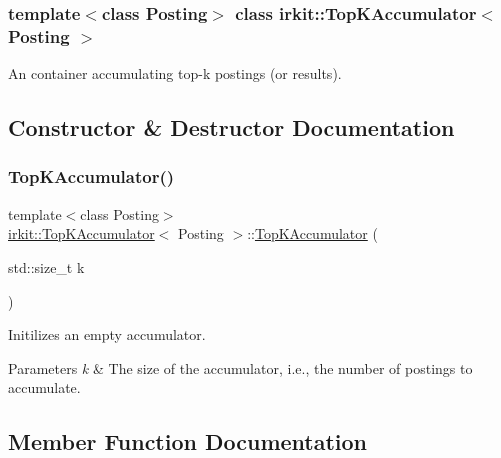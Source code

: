 \subsubsection*{template$<$class Posting$>$\newline
class irkit\+::\+Top\+K\+Accumulator$<$ Posting $>$}

An container accumulating top-\/k postings (or results). 

\subsection{Constructor \& Destructor Documentation}
\mbox{\label{classirkit_1_1TopKAccumulator_a74e1ee880b5d081bc0a3ba0e7fcdb1e3}} 
\subsubsection{\texorpdfstring{Top\+K\+Accumulator()}{TopKAccumulator()}}
{\footnotesize\ttfamily template$<$class Posting$>$ \\
\mbox{\hyperlink{classirkit_1_1TopKAccumulator}{irkit\+::\+Top\+K\+Accumulator}}$<$ Posting $>$\+::\mbox{\hyperlink{classirkit_1_1TopKAccumulator}{Top\+K\+Accumulator}} (\begin{DoxyParamCaption}\item[{std\+::size\+\_\+t}]{k }\end{DoxyParamCaption})\hspace{0.3cm}{\ttfamily [inline]}}



Initilizes an empty accumulator. 


\begin{DoxyParams}{Parameters}
{\em k} & The size of the accumulator, i.\+e., the number of postings to accumulate. \\
\hline
\end{DoxyParams}


\subsection{Member Function Documentation}
\mbox{\label{classirkit_1_1TopKAccumulator_a6caae6de2f8f555b4ad728d8819d1633}} 
